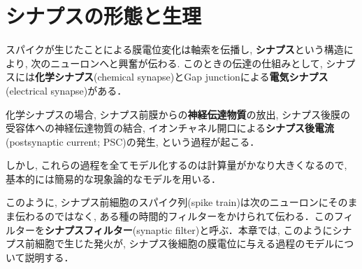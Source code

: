 \section{シナプスの形態と生理
}
スパイクが生じたことによる膜電位変化は軸索を伝播し, \textbf{シナプス}という構造により, 次のニューロンへと興奮が伝わる. このときの伝達の仕組みとして, シナプスには\textbf{化学シナプス}(chemical synapse)とGap junctionによる\textbf{電気シナプス}(electrical synapse)がある．  



化学シナプスの場合, シナプス前膜からの\textbf{神経伝達物質}の放出, シナプス後膜の受容体への神経伝達物質の結合, イオンチャネル開口による\textbf{シナプス後電流}(postsynaptic current; PSC)の発生, という過程が起こる．



しかし, これらの過程を全てモデル化するのは計算量がかなり大きくなるので, 基本的には簡易的な現象論的なモデルを用いる．



このように, シナプス前細胞のスパイク列(spike train)は次のニューロンにそのまま伝わるのではなく, ある種の時間的フィルターをかけられて伝わる．このフィルターを\textbf{シナプスフィルター}(synaptic filter)と呼ぶ．本章では, このようにシナプス前細胞で生じた発火が, シナプス後細胞の膜電位に与える過程のモデルについて説明する．



